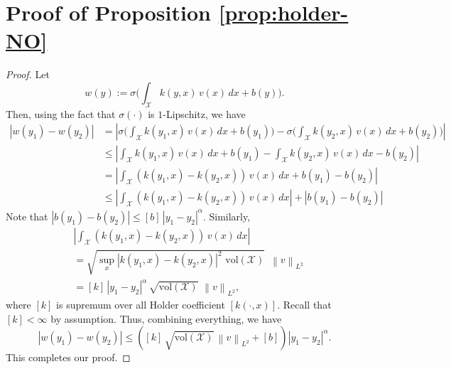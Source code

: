 \documentclass[11pt]{article}
\theoremstyle{plain}
\newcommand{\Xcal}{\mathcal{X}}
\newcommand{\norm}[1]{\left\lVert#1\right\rVert}
\begin{document}
\section{Proof of Proposition \ref{prop:holder-NO}}\label{appdx:proof_prop_NO}
\begin{proof}
Let 
\[w(y):= \sigma \Big(\int_{\mathcal{X}} k(y, x)\, v(x) \,dx + b(y) \Big). \]
Then, using the fact that $\sigma(\cdot)$ is $1$-Lipschitz, we have
\begin{equation*}
    \begin{split}
        |w(y_1) -w(y_2)| &= \left|\sigma \Big(\int_{\mathcal{X}} k(y_1, x)\, v(x) \,dx + b(y_1) \Big) - \sigma \Big(\int_{\mathcal{X}} k(y_2, x)\, v(x) \,dx + b(y_2) \Big) \right|\\
        &\leq \left|\int_{\mathcal{X}} k(y_1, x)\, v(x) \,dx + b(y_1)  - \int_{\mathcal{X}} k(y_2, x)\, v(x) \,dx - b(y_2)  \right|\\
        &= \left|\int_{\mathcal{X}} (k(y_1, x)-k(y_2, x))\, v(x) \,dx + b(y_1)  - b(y_2)  \right|\\
        &\leq \left|\int_{\mathcal{X}} (k(y_1, x)-k(y_2, x))\, v(x) \,dx \right| + \left|b(y_1)  - b(y_2)  \right|
    \end{split}
\end{equation*}
Note that $\left|b(y_1)  - b(y_2)  \right| \leq [b] \, |y_1-y_2|^{\alpha}$. Similarly, 
\begin{equation*}
    \begin{split}
   &\left|\int_{\mathcal{X}} (k(y_1, x)-k(y_2, x))\, v(x) \,dx \right|\\
   &= \sqrt{\sup_{x} |k(y_1, x)-k(y_2, x)|^2 \,\,  \text{vol}(\Xcal)}\, \, \, \norm{v}_{L^2}\\
   &= [k]\, |y_1-y_2|^{\alpha} \, \sqrt{\text{vol}(\Xcal)} \,\,\norm{v}_{L^2},
    \end{split}
\end{equation*}
where $[k]$ is supremum over all Holder coefficient $[k(\cdot, x)]$.  Recall that $[k]<\infty$ by assumption. Thus, combining everything, we have
\[   |w(y_1) -w(y_2)| \leq \left( [k]\,  \sqrt{\text{vol}(\Xcal)}\, \norm{v}_{L^2} + [b]\right) |y_1-y_2|^{\alpha}. \]
This completes our proof.
\end{proof}
\end{document}
